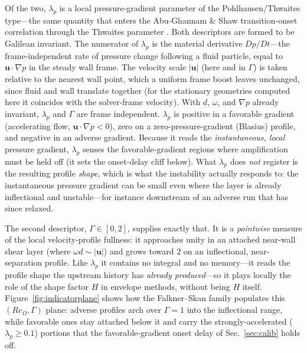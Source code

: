 \documentclass[journal]{new-aiaa}
\begin{document}
Of the two, $\lambda_p$ is a local pressure-gradient parameter of the
Pohlhausen/Thwaites type---the same quantity that enters the Abu-Ghannam \& Shaw
transition-onset correlation through the Thwaites parameter
\cite{abu_ghannam_shaw_1980}. Both descriptors are formed to be Galilean
invariant. The
numerator of $\lambda_p$ is the material derivative $Dp/Dt$---the frame-independent rate of
pressure change following a fluid particle, equal to $\mathbf{u}\cdot\nabla p$ in
the steady wall frame. The velocity scale $|\mathbf{u}|$ (here and in $\Gamma$) is
taken relative to the nearest wall point, which a uniform frame boost leaves
unchanged, since fluid and wall translate together (for the stationary
geometries computed here it coincides with the solver-frame velocity). With
$d$, $\omega$, and $\nabla p$ already invariant, $\lambda_p$ and $\Gamma$
are frame independent. $\lambda_p$ is positive in a favorable gradient
(accelerating flow, $\mathbf{u}\cdot\nabla p\!<\!0$), zero on a
zero-pressure-gradient (Blasius) profile, and negative in an adverse gradient.
Because it reads the \emph{instantaneous, local} pressure gradient, $\lambda_p$
senses the favorable-gradient regions where amplification
must be held off (it sets the onset-delay cliff below). What
$\lambda_p$ does \emph{not} register is the resulting profile \emph{shape}, which
is what the instability actually responds to: the instantaneous pressure gradient
can be small even where the layer is already inflectional and unstable---for
instance downstream of an adverse run that has since relaxed.

The second descriptor, $\Gamma\in[0,2]$, supplies exactly that. It is a
\emph{pointwise} measure of the local velocity-profile fullness: it approaches
unity in an attached near-wall shear layer (where $\omega d\!\sim\!|\mathbf{u}|$)
and grows toward $2$ on an inflectional, near-separation profile. Like
$\lambda_p$ it contains no integral and no memory---it reads the profile
shape the upstream history has \emph{already produced}---so it plays locally
the role of the shape factor $H$ in envelope methods, without being $H$ itself.
Figure~\ref{fig:indicatorplane} shows how the Falkner--Skan family populates this
$(Re_\Omega,\Gamma)$ plane: adverse profiles arch over $\Gamma\!=\!1$ into the
inflectional range, while favorable ones stay attached below it and carry the
strongly-accelerated ($\lambda_p\!\geq\!0.1$) portions that the favorable-gradient
onset delay of Sec.~\ref{sec:calib} holds off.
\end{document}
